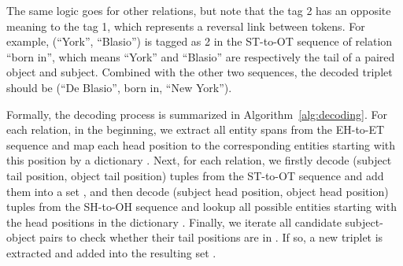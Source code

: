 \documentclass[11pt]{article}
\begin{document}
The same logic goes for other relations, but note that the tag 2 has an opposite meaning to the tag 1, which represents a reversal link between tokens. 
For example, (``York'', ``Blasio'') is tagged as 2 in the ST-to-OT sequence of relation ``born in'', which means ``York'' and ``Blasio'' are respectively the tail of a paired object and subject. 
Combined with the other two sequences, the decoded triplet should be (``De Blasio'', born in, ``New York'').

Formally, the decoding process is summarized in Algorithm~\ref{alg:decoding}. 
For each relation, in the beginning, we extract all entity spans from the EH-to-ET sequence and map each head position to the corresponding entities starting with this position by a dictionary . 
Next, for each relation, we firstly decode (subject tail position, object tail position) tuples from the ST-to-OT sequence and add them into a set , and then decode (subject head position, object head position) tuples from the SH-to-OH sequence and lookup all possible entities starting with the head positions in the dictionary .
Finally, we iterate all candidate subject-object pairs to check whether their tail positions are in  . If so, a new triplet is extracted and added into the resulting set . 
\end{document}
